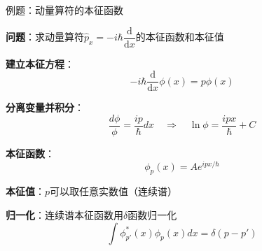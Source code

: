 \documentclass[aspectratio=169, 10pt]{beamer}
\begin{document}
\begin{frame}{例题：动量算符的本征函数}

  \textbf{问题}：求动量算符$\hat{p}_x = -i\hbar\dfrac{\mathrm{d}}{\mathrm{d}x}$的本征函数和本征值

  \begin{iqbitemize}
    \item \textbf{建立本征方程}：
    \[
      -i\hbar\dfrac{\mathrm{d}}{\mathrm{d}x}\phi(x) = p\phi(x)
    \]

    \item \textbf{分离变量并积分}：
    \[
      \dfrac{d\phi}{\phi} = \dfrac{i p}{\hbar}dx \quad \Rightarrow \quad \ln\phi = \dfrac{ipx}{\hbar} + C
    \]

    \item \textbf{本征函数}：
    \[
      \phi_p(x) = A e^{ipx/\hbar}
    \]

    \item \textbf{本征值}：$p$可以取任意实数值（连续谱）

    \item \textbf{归一化}：连续谱本征函数用$\delta$函数归一化
    \[
      \int \phi_{p'}^*(x)\phi_p(x)dx = \delta(p-p')
    \]
  \end{iqbitemize}
\end{frame}
\end{document}
